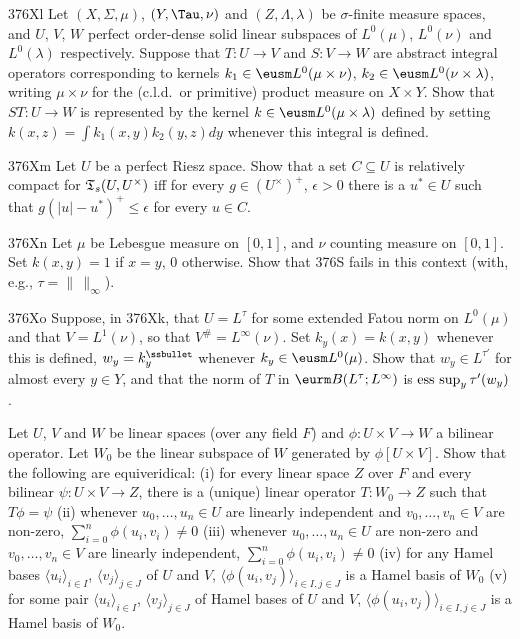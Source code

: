 {\spheader 376Xl Let $(X,\Sigma,\mu)$, $(Y,\Tau,\nu)$ and
$(Z,\Lambda,\lambda)$ be $\sigma$-finite measure spaces, and $U$, $V$,
$W$ perfect order-dense solid linear subspaces of $L^0(\mu)$, $L^0(\nu)$
and $L^0(\lambda)$ respectively.   Suppose that $T:U\to V$ and $S:V\to
W$ are abstract integral operators corresponding to kernels
$k_1\in\eusm L^0(\mu\times\nu)$, $k_2\in\eusm L^0(\nu\times\lambda)$,
writing
$\mu\times\nu$ for the (c.l.d.\ or primitive) product measure on
$X\times Y$.   Show that $ST:U\to W$ is represented by the kernel
$k\in\eusm L^0(\mu\times\lambda)$ defined by setting
$k(x,z)=\int k_1(x,y)k_2(y,z)dy$ whenever this integral is defined.

\spheader 376Xm Let $U$ be a perfect Riesz space.   Show that a set
$C\subseteq U$ is relatively compact for $\frak T_s(U,U^{\times})$ iff
for every $g\in(U^{\times})^+$, $\epsilon>0$ there is a $u^*\in U$ such
that $g(|u|-u^*)^+\le\epsilon$ for every $u\in C$.   

\sqheader 376Xn Let $\mu$ be Lebesgue measure on $[0,1]$, and $\nu$
counting measure on $[0,1]$.   Set $k(x,y)=1$ if $x=y$, $0$ otherwise.
Show that 376S fails in this context (with, e.g.,
$\tau=\|\,\|_{\infty}$).

\spheader 376Xo Suppose, in 376Xk, that $U=L^{\tau}$ for some extended
Fatou norm on $L^0(\mu)$ and that $V=L^1(\nu)$, so that
$V^{\#}=L^{\infty}(\nu)$.   Set $k_y(x)=k(x,y)$ whenever this is
defined, $w_y=k_y^{\ssbullet}$ whenever $k_y\in\eusm L^0(\mu)$.   Show
that $w_y\in L^{\tau'}$ for almost every $y\in Y$, and that the norm of
$T$ in $\eurm B(L^{\tau};L^{\infty})$ is $\mathop{\text{ess sup}}_y\tau'(w_y)$.

Let $U$, $V$ and $W$ be linear spaces (over any field $F$) and
$\phi:U\times V\to W$ a bilinear operator.   Let $W_0$ be the linear subspace
of $W$ generated by $\phi[U\times V]$.   Show that the following are
equiveridical:  (i) for every linear space $Z$ over $F$ and every
bilinear
$\psi:U\times V\to Z$, there is a (unique) linear operator $T:W_0\to Z$
such
that $T\phi=\psi$ (ii) whenever $u_0,\ldots,u_n\in U$ are linearly
independent and $v_0,\ldots,v_n\in V$ are non-zero,
$\sum_{i=0}^n\phi(u_i,v_i)\ne 0$
(iii) whenever $u_0,\ldots,u_n\in U$ are non-zero and
$v_0,\ldots,v_n\in V$ are linearly independent,
$\sum_{i=0}^n\phi(u_i,v_i)\ne 0$ (iv) for
any Hamel bases $\langle u_i\rangle_{i\in I}$,
$\langle v_j\rangle_{j\in J}$ of $U$ and $V$,
$\langle\phi(u_i,v_j)\rangle_{i\in I,j\in J}$ is a
Hamel basis of $W_0$
(v) for some pair $\langle u_i\rangle_{i\in I}$,
$\langle v_j\rangle_{j\in J}$ of Hamel bases of $U$ and $V$,
$\langle\phi(u_i,v_j)\rangle_{i\in I,j\in J}$ is a Hamel basis of $W_0$.

}
